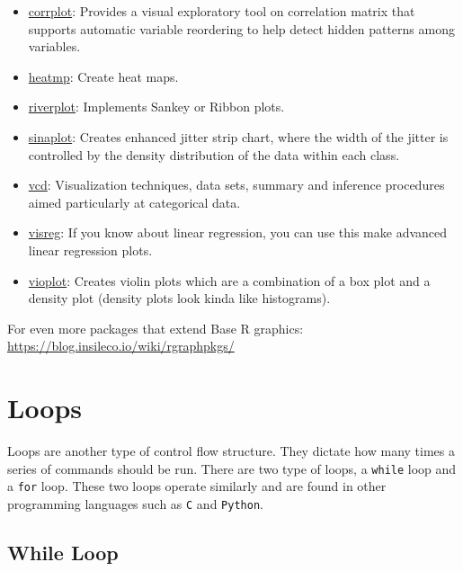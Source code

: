 \documentclass[
]{book}
\begin{document}
\begin{itemize}
\item
  \href{https://cran.r-project.org/web/packages/corrplot/}{corrplot}: Provides a visual exploratory tool on correlation matrix that supports automatic variable reordering to help detect hidden patterns among variables.
\item
  \href{https://cran.r-project.org/web/packages/heatmap3/}{heatmp}: Create heat maps.
\item
  \href{https://cran.r-project.org/web/packages/riverplot/}{riverplot}: Implements Sankey or Ribbon plots.
\item
  \href{https://cran.r-project.org/web/packages/sinaplot/}{sinaplot}: Creates enhanced jitter strip chart, where the width of the jitter is controlled by the density distribution of the data within each class.
\item
  \href{https://cran.r-project.org/web/packages/vcd/}{vcd}: Visualization techniques, data sets, summary and inference procedures aimed particularly at categorical data.
\item
  \href{https://cran.r-project.org/web/packages/visreg/}{visreg}: If you know about linear regression, you can use this make advanced linear regression plots.
\item
  \href{https://cran.r-project.org/web/packages/vioplot/index.html}{vioplot}: Creates violin plots which are a combination of a box plot and a density plot (density plots look kinda like histograms).
\end{itemize}

For even more packages that extend Base R graphics: \url{https://blog.insileco.io/wiki/rgraphpkgs/}

\hypertarget{loops}{%
\chapter{Loops}\label{loops}}

Loops are another type of control flow structure. They dictate how many times a series of commands should be run. There are two type of loops, a \texttt{while} loop and a \texttt{for} loop. These two loops operate similarly and are found in other programming languages such as \texttt{C} and \texttt{Python}.

\hypertarget{while-loop}{%
\section{While Loop}\label{while-loop}}
\end{document}
